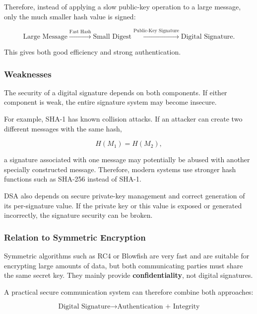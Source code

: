\documentclass[a4paper, 10pt]{article}
\begin{document}
\begin{problem}
\begin{subproblems_alpha}
\begin{solution}
		      Therefore, instead of applying a slow public-key operation to a large message,
		      only the much smaller hash value is signed:

		      \[
			      \text{Large Message}
			      \xrightarrow{\text{Fast Hash}}
			      \text{Small Digest}
			      \xrightarrow{\text{Public-Key Signature}}
			      \text{Digital Signature}.
		      \]

		      This gives both good efficiency and strong authentication.

		      \subsubsection*{Weaknesses}

		      The security of a digital signature depends on both components.
		      If either component is weak, the entire signature system may become insecure.

		      For example, SHA-1 has known collision attacks.
		      If an attacker can create two different messages with the same hash,

		      \[
			      H(M_1)=H(M_2),
		      \]

		      a signature associated with one message may potentially be abused
		      with another specially constructed message.
		      Therefore, modern systems use stronger hash functions such as SHA-256 instead of SHA-1.

		      DSA also depends on secure private-key management
		      and correct generation of its per-signature value.
		      If the private key or this value is exposed or generated incorrectly,
		      the signature security can be broken.

		      \subsubsection*{Relation to Symmetric Encryption}

		      Symmetric algorithms such as RC4 or Blowfish are very fast
		      and are suitable for encrypting large amounts of data,
		      but both communicating parties must share the same secret key.
		      They mainly provide \textbf{confidentiality}, not digital signatures.

		      A practical secure communication system can therefore combine both approaches:

		      \[
			      \text{Digital Signature}
			      \rightarrow
			      \text{Authentication + Integrity}
		      \]


\end{solution}
\end{subproblems_alpha}
\end{problem}
\end{document}
